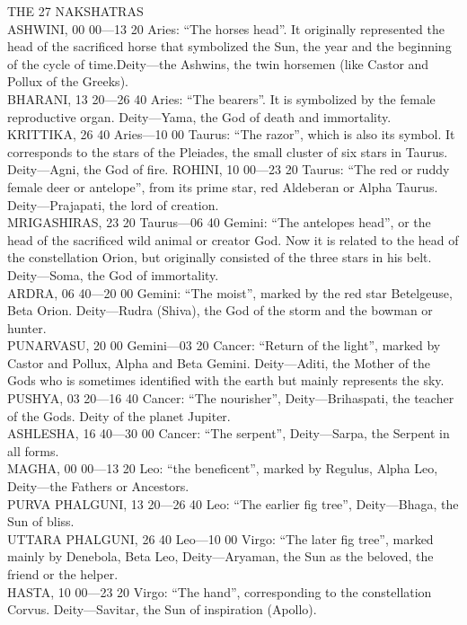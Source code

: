 THE 27 NAKSHATRAS\\
ASHWINI, 00 00—13 20 Aries:  “The horses head”. It originally represented the head of the sacrificed horse that symbolized the Sun, the year and the beginning of the cycle of time.Deity—the Ashwins, the twin horsemen (like Castor and Pollux of the Greeks).\\
BHARANI, 13 20—26 40 Aries:  “The bearers”. It is symbolized by the female reproductive organ. Deity—Yama, the God of death and immortality.\\
KRITTIKA, 26 40 Aries—10 00 Taurus:  “The razor”, which is also its symbol. It corresponds to the stars of the Pleiades, the small cluster of six stars in Taurus. Deity—Agni, the God of fire.
ROHINI, 10 00—23 20 Taurus:  “The red or ruddy female deer or antelope”, from its prime star, red Aldeberan or Alpha Taurus. Deity—Prajapati, the lord of creation.\\
MRIGASHIRAS, 23 20 Taurus—06 40 Gemini:  “The antelopes head”, or the head of the sacrificed wild animal or creator God. Now it is related to the head of the constellation Orion, but originally consisted of the three stars in his belt. Deity—Soma, the God of immortality.\\
ARDRA, 06 40—20 00 Gemini:  “The moist”, marked by the red star Betelgeuse, Beta Orion. Deity—Rudra (Shiva), the God of the storm and the bowman or hunter.\\
PUNARVASU, 20 00 Gemini—03 20 Cancer:  “Return of the light”, marked by Castor and Pollux, Alpha and Beta Gemini. Deity—Aditi, the Mother of the Gods who is sometimes identified with the earth but mainly represents the sky.\\
PUSHYA, 03 20—16 40 Cancer:  “The nourisher”, Deity—Brihaspati, the teacher of the Gods. Deity of the planet Jupiter.\\
ASHLESHA, 16 40—30 00 Cancer:  “The serpent”, Deity—Sarpa, the Serpent in all forms.\\
MAGHA, 00 00—13 20 Leo:  “the beneficent”, marked by Regulus, Alpha Leo, Deity—the Fathers or Ancestors.\\
PURVA PHALGUNI, 13 20—26 40 Leo:  “The earlier fig tree”, Deity—Bhaga, the Sun of bliss.\\
UTTARA PHALGUNI, 26 40 Leo—10 00 Virgo:   “The later fig tree”, marked mainly by Denebola, Beta Leo, Deity—Aryaman, the Sun as the beloved, the friend or the helper.\\
HASTA, 10 00—23 20 Virgo:  “The hand”, corresponding to the constellation Corvus. Deity—Savitar, the Sun of inspiration (Apollo).\\
